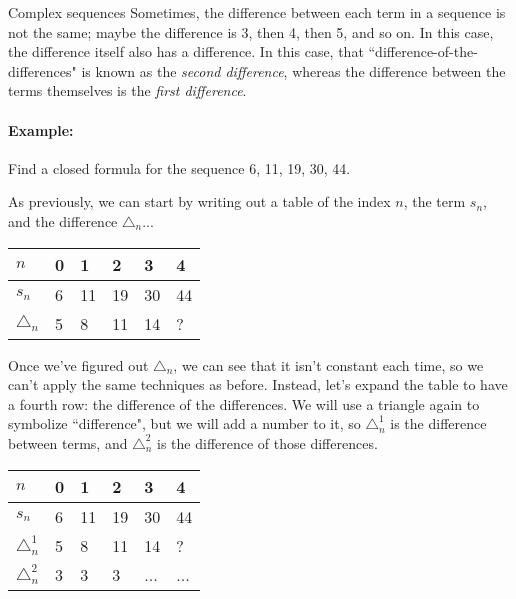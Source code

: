     \begin{intro}{Complex sequences}
        Sometimes, the difference between each term in a sequence is not the same;
        maybe the difference is 3, then 4, then 5, and so on. In this case,
        the difference itself also has a difference. In this case,
        that ``difference-of-the-differences" is known as the \textit{second difference},
        whereas the difference between the terms themselves is the \textit{first difference}.

        \paragraph{Example:} Find a closed formula for the sequence 6, 11, 19, 30, 44.

        As previously, we can start by writing out a table of the index $n$, the term $s_{n}$,
        and the difference $\triangle_{n}$...

        \begin{center}
            \begin{tabular}{l | l l l l l}
                $n$ & 0 & 1 & 2 & 3 & 4
                \\ \hline
                $s_{n}$ & 6 & 11 & 19 & 30 & 44
                \\ \hline
                $\triangle_{n}$ & 5 & 8 & 11 & 14 & ?
            \end{tabular}
        \end{center}

        Once we've figured out $\triangle_{n}$, we can see that it isn't
        constant each time, so we can't apply the same techniques as before.
        Instead, let's expand the table to have a fourth row: the difference
        of the differences. We will use a triangle again to symbolize ``difference",
        but we will add a number to it, so $\triangle_{n}^{1}$ is the difference
        between terms, and $\triangle_{n}^{2}$ is the difference of those
        differences.
        
        \begin{center}
            \begin{tabular}{l | l l l l l}
                $n$ & 0 & 1 & 2 & 3 & 4
                \\ \hline
                $s_{n}$ & 6 & 11 & 19 & 30 & 44
                \\ \hline
                $\triangle_{n}^{1}$ & 5 & 8 & 11 & 14 & ?
                \\ \hline
                $\triangle_{n}^{2}$ & 3 & 3 & 3 & ... & ...
            \end{tabular}
        \end{center}


\end{intro}
